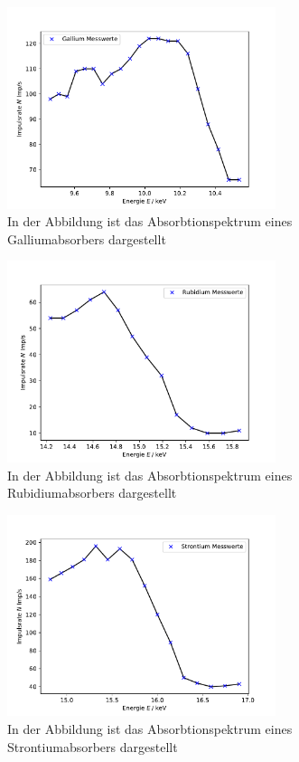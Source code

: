 \begin{figure}[H]
    \centering
    \includegraphics[width=0.7\textwidth]{plots/Gallium.pdf}
    \caption{In der Abbildung ist das Absorbtionspektrum eines Galliumabsorbers dargestellt}
\end{figure}
\begin{figure}[H]
    \centering
    \includegraphics[width=0.7\textwidth]{plots/Rubidium.pdf}
    \caption{In der Abbildung ist das Absorbtionspektrum eines Rubidiumabsorbers dargestellt}
\end{figure}
\begin{figure}[H]
    \centering
    \includegraphics[width=0.7\textwidth]{plots/Strontium.pdf}
    \caption{In der Abbildung ist das Absorbtionspektrum eines Strontiumabsorbers dargestellt}
\end{figure}
